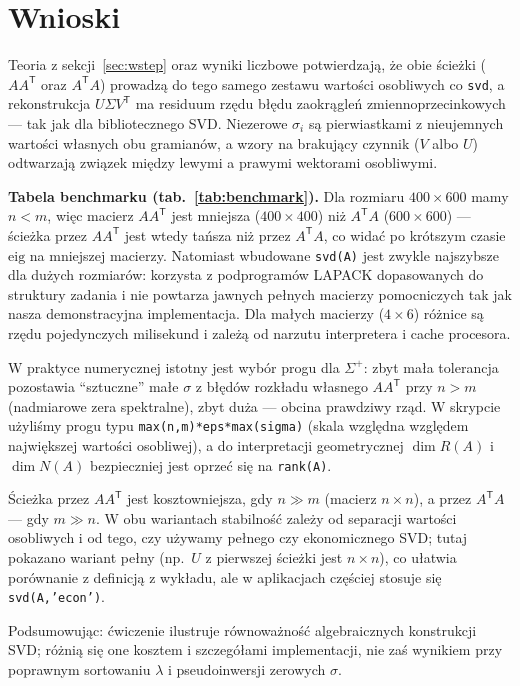 \documentclass[polish]{template/projectreport}
\begin{document}

\section{Wnioski}
\begin{sloppypar}
Teoria z sekcji~\ref{sec:wstep} oraz wyniki liczbowe potwierdzają, że obie ścieżki ($AA^{\mathsf{T}}$ oraz $A^{\mathsf{T}}A$) prowadzą do tego samego
zestawu wartości osobliwych co \texttt{svd}, a rekonstrukcja $U\Sigma V^{\mathsf{T}}$ ma residuum rzędu błędu zaokrągleń
zmiennoprzecinkowych --- tak jak dla bibliotecznego SVD. Niezerowe $\sigma_i$ są pierwiastkami z nieujemnych wartości własnych obu gramianów, a wzory na brakujący czynnik ($V$ albo $U$) odtwarzają związek między lewymi a prawymi wektorami osobliwymi.

\textbf{Tabela benchmarku (tab.~\ref{tab:benchmark}).}
Dla rozmiaru $400\times 600$ mamy $n<m$, więc macierz $AA^{\mathsf{T}}$ jest mniejsza ($400\times 400$) niż $A^{\mathsf{T}}A$ ($600\times 600$) --- ścieżka przez $AA^{\mathsf{T}}$ jest wtedy tańsza niż przez $A^{\mathsf{T}}A$, co widać po krótszym czasie $\mathrm{eig}$ na mniejszej macierzy.
Natomiast wbudowane \texttt{svd(A)} jest zwykle najszybsze dla dużych rozmiarów: korzysta z podprogramów LAPACK dopasowanych do struktury zadania i nie powtarza jawnych pełnych macierzy pomocniczych tak jak nasza demonstracyjna implementacja.
Dla małych macierzy ($4\times 6$) różnice są rzędu pojedynczych milisekund i zależą od narzutu interpretera i cache procesora.

W praktyce numerycznej istotny jest wybór progu dla $\Sigma^{+}$: zbyt mała tolerancja pozostawia ``sztuczne'' małe $\sigma$
z błędów rozkładu własnego $AA^{\mathsf{T}}$ przy $n>m$ (nadmiarowe zera spektralne), zbyt duża --- obcina prawdziwy rząd.
W skrypcie użyliśmy progu typu \texttt{max(n,m)*eps*max(sigma)} (skala względna względem największej wartości osobliwej),
a do interpretacji geometrycznej $\dim R(A)$ i $\dim N(A)$ bezpieczniej jest oprzeć się na \texttt{rank(A)}.

Ścieżka przez $AA^{\mathsf{T}}$ jest kosztowniejsza, gdy $n\gg m$ (macierz $n\times n$), a przez $A^{\mathsf{T}}A$ --- gdy $m\gg n$.
W obu wariantach stabilność zależy od separacji wartości osobliwych i od tego, czy używamy pełnego czy ekonomicznego SVD;
tutaj pokazano wariant pełny (np.\ $U$ z pierwszej ścieżki jest $n\times n$), co ułatwia porównanie z definicją z wykładu,
ale w aplikacjach częściej stosuje się \texttt{svd(A,'econ')}.

Podsumowując: ćwiczenie ilustruje równoważność algebraicznych konstrukcji SVD; różnią się one kosztem i szczegółami implementacji,
nie zaś wynikiem przy poprawnym sortowaniu $\lambda$ i pseudoinwersji zerowych $\sigma$.
\end{sloppypar}
\end{document}
